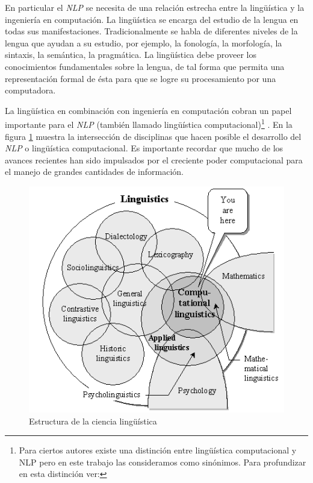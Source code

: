 \documentclass[letterpaper,12pt,oneside]{book}
\newcommand{\note}[4][]{\todo[author=#2,color=#3,size=\scriptsize,fancyline,caption={},#1]{#4}} %
\newcommand{\diego}[2][]{\note[#1]{Diego}{blue!40}{#2}}
\theoremstyle{definition}
\begin{document}
En particular el \textit{NLP} se necesita de una relación estrecha entre la lingüística y la ingeniería en computación. La lingüística se encarga del estudio de la lengua en todas sus manifestaciones. Tradicionalmente se habla de diferentes niveles de la lengua que ayudan a su estudio, por ejemplo, la fonología, la morfología, la sintaxis, la semántica, la pragmática. La lingüística debe proveer los conocimientos fundamentales sobre la lengua, de tal forma que permita una representación formal de ésta para que se logre su procesamiento por una computadora.


La lingüística en combinación con ingeniería en computación cobran un papel importante para el \textit{NLP} (también llamado lingüística computacional)\footnote{Para ciertos autores existe una distinción entre lingüística computacional y NLP pero en este trabajo las consideramos como sinónimos. Para profundizar en esta distinción ver: } \diego{TODO: cita de jurafsky y manning}. En la figura \ref{fig:compu_linguistics} muestra la intersección de disciplinas que hacen posible el desarrollo  del \textit{NLP} o lingüística computacional. Es importante recordar que mucho de los avances recientes han sido impulsados por el creciente poder computacional para el manejo de grandes cantidades de información.

\begin{figure}[ht]
	\centering
	\includegraphics[scale=0.5]{computational_linguistics}
	\caption{Estructura de la ciencia lingüística \citep{bolshakov2004computational}}
	\label{fig:compu_linguistics}
\end{figure}
\end{document}
